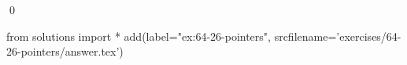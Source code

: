 
\begin{ex}
  \label{ex:64-26-pointers}
  
  \qed
\end{ex}
\begin{python0}
from solutions import *
add(label="ex:64-26-pointers",
    srcfilename='exercises/64-26-pointers/answer.tex')
\end{python0}
